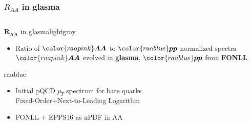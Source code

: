 \documentclass[aspectratio=169,11pt,usenames,dvipsnames]{beamer}
\begin{document}

\begin{frame}[noframenumbering]
    \frametitle{$R_{AA}$ in glasma}
    {\vspace{-20pt}
    \begin{columns}[onlytextwidth,t]
       \begin{center}
        \begin{custombox2transp}{$\boldsymbol{R_{AA}}$ in glasma}{lightgray}
            \small{}
            \begin{varwidth}{1.05\textwidth}
            \begin{itemize}\itemsep0em 
                \itemsep0em
                \item Ratio of ${\color{raapink}\boldsymbol{AA}}$ to ${\color{raablue}\boldsymbol{pp}}$ normalized spectra \\
                {\scriptsize\color{lightgray}${\color{raapink}\boldsymbol{AA}}$ evolved in {\color{raapink}\bfseries glasma}, ${\color{raablue}\boldsymbol{pp}}$ from {\color{raablue}\bfseries FONLL}}
            \end{itemize}
            \end{varwidth}
        \end{custombox2transp}
        \begin{custombox2transp}{}{raablue}
            \small{}
            \begin{varwidth}{1.05\textwidth}
            \begin{itemize}\itemsep0em 
                \itemsep0em
                \footnotesize
                \item Initial pQCD $p_T$ spectrum for bare quarks\\
                {\scriptsize\color{lightgray}Fixed-Order+Next-to-Leading Logarithm}
                \item FONLL + {\color{palteal}EPPS16} as nPDF in AA

\end{itemize}
\end{varwidth}
\end{custombox2transp}
\end{center}
\end{columns}}
\end{frame}
\end{document}
